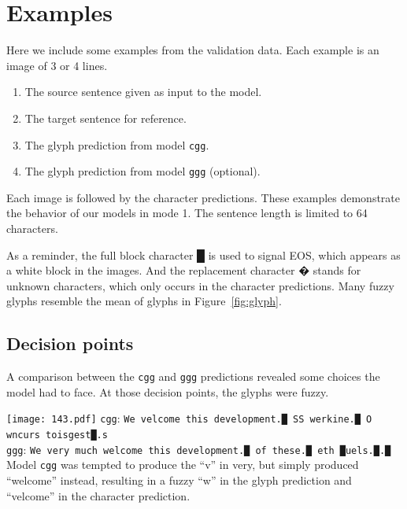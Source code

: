 \documentclass[11pt,twocolumn]{article}
\begin{document}
\printbibliography[]

\appendix
\onecolumn

\section{Examples}\label{sec:examples}

Here we include some examples from the validation data.
Each example is an image of 3 or 4 lines.

\begin{enumerate}
\item The source sentence given as input to the model.
\item The target sentence for reference.
\item The glyph prediction from model \texttt{cgg}.
\item The glyph prediction from model \texttt{ggg} (optional).
\end{enumerate}

Each image is followed by the character predictions.
These examples demonstrate the behavior of our models in mode 1.
The sentence length is limited to 64 characters.

As a reminder, the full block character █ is used to signal EOS,
which appears as a white block in the images.
And the replacement character � stands for unknown characters,
which only occurs in the character predictions.
Many fuzzy glyphs resemble the mean of glyphs in Figure~\ref{fig:glyph}.

\subsection{Decision points}\label{sec:decision-points}

A comparison between the \texttt{cgg} and \texttt{ggg} predictions
revealed some choices the model had to face.
At those decision points, the glyphs were fuzzy.

\vspace{1.2em}\noindent\texttt{[image: 143.pdf]}
\texttt{cgg}: \texttt{We velcome this development.█ SS  werkine.█ O wncurs toisgest█.s}\\
\texttt{ggg}: \texttt{We very much welcome this development.█ of these.█ eth █uels.█.█}\\

\vspace{-0.8em}
Model \texttt{cgg} was tempted to produce the ``v'' in very,
but simply produced ``welcome'' instead,
resulting in a fuzzy ``w'' in the glyph prediction and ``velcome'' in the character prediction.
\end{document}
